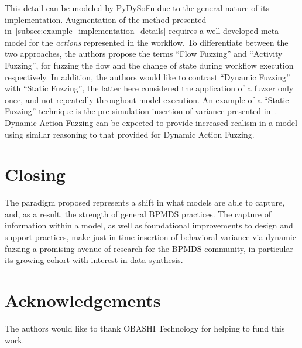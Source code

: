 \documentclass[draft,12pt]{llncs}  %
\begin{document}
This detail can be modeled by PyDySoFu due to the general nature of its
implementation. Augmentation of the method presented
in~\cref{subsec:example_implementation_details} requires a well-developed
meta-model for the \emph{actions} represented in the workflow. To differentiate
between the two approaches, the authors propose the terms ``Flow Fuzzing'' and
``Activity Fuzzing'', for fuzzing the flow and the change of state during
workflow execution respectively. In addition, the authors would like to contrast
``Dynamic Fuzzing'' with ``Static Fuzzing'', the latter here considered the
application of a fuzzer only once, and not repeatedly throughout model
execution. An example of a ``Static Fuzzing'' technique is the pre-simulation
insertion of variance presented in~\cite{pourmasoumi2015business}. Dynamic
Action Fuzzing can be expected to provide increased realism in a model using
similar reasoning to that provided for Dynamic Action Fuzzing.
\par


\section{Closing}
The paradigm proposed represents a shift in what models are able to capture,
and, as a result, the strength of general BPMDS practices. The capture of
information within a model, as well as foundational improvements
to design and support practices, make just-in-time insertion of behavioral
variance via dynamic fuzzing a promising avenue of research for the BPMDS
community, in particular its growing cohort with interest in data synthesis.
\par

\section*{Acknowledgements}
The authors would like to thank OBASHI Technology for helping to fund this work.


\end{document}
